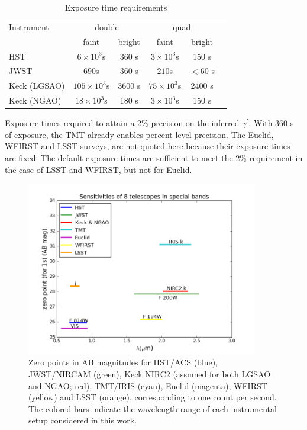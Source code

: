 \documentclass[a4paper,11pt]{article}
\begin{document}
{%
\begin{table}\footnotesize
\begin{center}
\caption{Exposure time requirements}
\begin{tabular}{lccccc|}
\hline \hline
Instrument & \multicolumn{2}{c}{double} & \multicolumn{2}{c}{quad} \\
  & faint  & bright &  faint  &  bright \\
\hline
  HST   & $6\times10^3$s & 360 s  & $3\times10^3$s & 150 s \\
  JWST   & $690$s & 360 s  & $210$s & $<$60 s \\
  Keck (LGSAO)   & $105\times10^3$s & 3600 s  & $75\times10^3$s & 2400 s \\
  Keck (NGAO)   & $18\times10^3$s & 180 s  & $3\times10^3$s & 150 s \\
\hline
\hline
\end{tabular}
\begin{tablenotes}
\item 
Exposure times required to attain a 2\% precision on the inferred $\gamma^\prime.$
 With 360 s of exposure, the TMT already enables percent-level precision.
 The Euclid, WFIRST and LSST surveys, are not quoted here because their exposure times are fixed. The default exposure times are sufficient to meet the 2\% requirement in the case of LSST and WFIRST, but not for Euclid.\\
\end{tablenotes}
\label{tab:exptimes}
\end{center}
\end{table}

\begin{figure}
\begin{center}
\includegraphics[width=0.9\textwidth]{figures/wavelength_zp.png}
\end{center}
\caption{Zero points in AB magnitudes for HST/ACS (blue), JWST/NIRCAM (green), Keck NIRC2  (assumed for both LGSAO and NGAO; red), TMT/IRIS (cyan), Euclid (magenta), WFIRST (yellow) and LSST (orange), corresponding to one count per second. The colored bars indicate the wavelength range of each instrumental setup considered in this work.}
\label{fig:zp_wavelength}
\end{figure}


}
\end{document}
